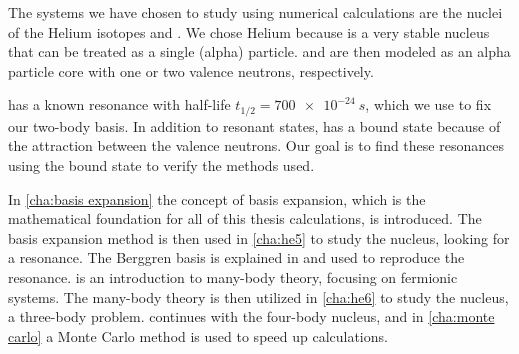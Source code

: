The systems we have chosen to study using numerical calculations
are the nuclei of the  Helium isotopes  and . We chose Helium  
because  is a very stable nucleus that can be treated 
as a single (alpha) particle.  and  are then modeled
as an alpha particle core with one or two valence neutrons, 
respectively. 

 has a known resonance with half-life $t_{1/2} = \SI{700e-24}{s}$,
which we use to fix our two-body basis. In addition to resonant states,  has a bound state because of the attraction between the valence neutrons. Our goal is to find these resonances using the bound state to verify the methods used.

In \cref{cha:basis expansion} the concept of 
basis expansion, which is the mathematical foundation for all of this thesis calculations, is introduced.
The basis expansion method is then used in 
\cref{cha:he5} to study the  nucleus, looking for a resonance.
The Berggren basis is explained in and used to reproduce the resonance.
 is an introduction to many-body theory, focusing 
on fermionic systems. The many-body theory is then utilized in \cref{cha:he6} 
to study the  nucleus, a three-body problem. 
continues with the four-body  nucleus, and in \cref{cha:monte carlo}
a Monte Carlo method is used to speed up calculations.
